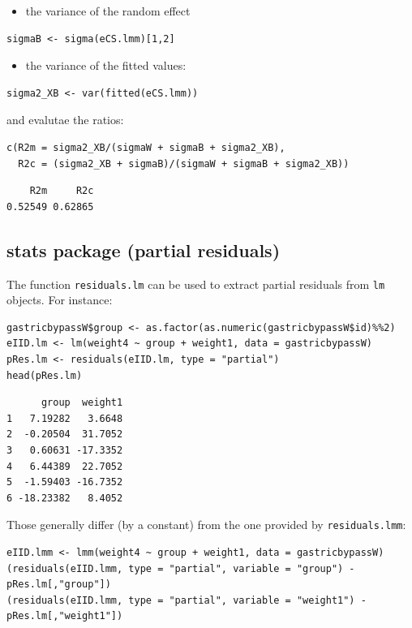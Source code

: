 \documentclass[12pt]{article}
\begin{document}
\begin{itemize}
\item the variance of the random effect
\end{itemize}
\lstset{language=r,label= ,caption= ,captionpos=b,numbers=none}
\begin{lstlisting}
sigmaB <- sigma(eCS.lmm)[1,2]
\end{lstlisting}

\begin{itemize}
\item the variance of the fitted values:
\end{itemize}
\lstset{language=r,label= ,caption= ,captionpos=b,numbers=none}
\begin{lstlisting}
sigma2_XB <- var(fitted(eCS.lmm))
\end{lstlisting}

and evalutae the ratios:
\lstset{language=r,label= ,caption= ,captionpos=b,numbers=none}
\begin{lstlisting}
c(R2m = sigma2_XB/(sigmaW + sigmaB + sigma2_XB),
  R2c = (sigma2_XB + sigmaB)/(sigmaW + sigmaB + sigma2_XB))
\end{lstlisting}

\begin{verbatim}
    R2m     R2c 
0.52549 0.62865
\end{verbatim}

\subsection{stats package (partial residuals)}
\label{sec:org54e828b}

The function \texttt{residuals.lm} can be used to extract partial residuals
from \texttt{lm} objects. For instance:
\lstset{language=r,label= ,caption= ,captionpos=b,numbers=none}
\begin{lstlisting}
gastricbypassW$group <- as.factor(as.numeric(gastricbypassW$id)%%2)
eIID.lm <- lm(weight4 ~ group + weight1, data = gastricbypassW)
pRes.lm <- residuals(eIID.lm, type = "partial")
head(pRes.lm)
\end{lstlisting}

\begin{verbatim}
      group  weight1
1   7.19282   3.6648
2  -0.20504  31.7052
3   0.60631 -17.3352
4   6.44389  22.7052
5  -1.59403 -16.7352
6 -18.23382   8.4052
\end{verbatim}


Those generally differ (by a constant) from the one provided by
\texttt{residuals.lmm}:
\lstset{language=r,label= ,caption= ,captionpos=b,numbers=none}
\begin{lstlisting}
eIID.lmm <- lmm(weight4 ~ group + weight1, data = gastricbypassW)
(residuals(eIID.lmm, type = "partial", variable = "group") - pRes.lm[,"group"])
(residuals(eIID.lmm, type = "partial", variable = "weight1") - pRes.lm[,"weight1"])
\end{lstlisting}
\end{document}

